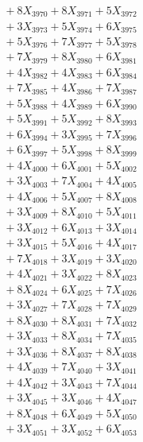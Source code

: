 \documentclass[a4paper,10pt]{article}
\begin{document}
{\begin{align}
&\;  + 8 X_{3970} + 8 X_{3971} + 5 X_{3972} \\[0.3ex]
&\;  + 3 X_{3973} + 5 X_{3974} + 6 X_{3975} \\[0.3ex]
&\;  + 5 X_{3976} + 7 X_{3977} + 5 X_{3978} \\[0.3ex]
&\;  + 7 X_{3979} + 8 X_{3980} + 6 X_{3981} \\[0.3ex]
&\;  + 4 X_{3982} + 4 X_{3983} + 6 X_{3984} \\[0.3ex]
&\;  + 7 X_{3985} + 4 X_{3986} + 7 X_{3987} \\[0.3ex]
&\;  + 5 X_{3988} + 4 X_{3989} + 6 X_{3990} \\[0.3ex]
&\;  + 5 X_{3991} + 5 X_{3992} + 8 X_{3993} \\[0.3ex]
&\;  + 6 X_{3994} + 3 X_{3995} + 7 X_{3996} \\[0.3ex]
&\;  + 6 X_{3997} + 5 X_{3998} + 8 X_{3999} \\[0.5ex]\allowbreak
&\;  + 4 X_{4000} + 6 X_{4001} + 5 X_{4002} \\[0.3ex]
&\;  + 3 X_{4003} + 7 X_{4004} + 4 X_{4005} \\[0.3ex]
&\;  + 4 X_{4006} + 5 X_{4007} + 8 X_{4008} \\[0.3ex]
&\;  + 3 X_{4009} + 8 X_{4010} + 5 X_{4011} \\[0.3ex]
&\;  + 3 X_{4012} + 6 X_{4013} + 3 X_{4014} \\[0.3ex]
&\;  + 3 X_{4015} + 5 X_{4016} + 4 X_{4017} \\[0.3ex]
&\;  + 7 X_{4018} + 3 X_{4019} + 3 X_{4020} \\[0.3ex]
&\;  + 4 X_{4021} + 3 X_{4022} + 8 X_{4023} \\[0.3ex]
&\;  + 8 X_{4024} + 6 X_{4025} + 7 X_{4026} \\[0.3ex]
&\;  + 3 X_{4027} + 7 X_{4028} + 7 X_{4029} \\[0.5ex]\allowbreak
&\;  + 8 X_{4030} + 8 X_{4031} + 7 X_{4032} \\[0.3ex]
&\;  + 3 X_{4033} + 8 X_{4034} + 7 X_{4035} \\[0.3ex]
&\;  + 3 X_{4036} + 8 X_{4037} + 8 X_{4038} \\[0.3ex]
&\;  + 4 X_{4039} + 7 X_{4040} + 3 X_{4041} \\[0.3ex]
&\;  + 4 X_{4042} + 3 X_{4043} + 7 X_{4044} \\[0.3ex]
&\;  + 3 X_{4045} + 3 X_{4046} + 4 X_{4047} \\[0.3ex]
&\;  + 8 X_{4048} + 6 X_{4049} + 5 X_{4050} \\[0.3ex]
&\;  + 3 X_{4051} + 3 X_{4052} + 6 X_{4053} \\[0.3ex]

\end{align}}
\end{document}
